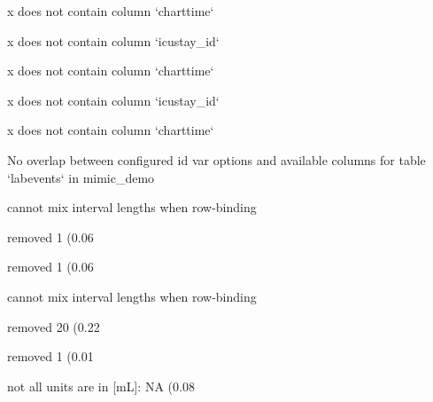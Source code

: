 \documentclass[
]{jss}
\begin{document}
\begin{CodeChunk}
\begin{CodeOutput}
x does not contain column `charttime`
\end{CodeOutput}

\begin{CodeOutput}
x does not contain column `icustay_id`
\end{CodeOutput}

\begin{CodeOutput}
x does not contain column `charttime`
\end{CodeOutput}

\begin{CodeOutput}
x does not contain column `icustay_id`
\end{CodeOutput}

\begin{CodeOutput}
x does not contain column `charttime`
\end{CodeOutput}

\begin{CodeOutput}
No overlap between configured id var options and available columns for table
`labevents` in mimic_demo
\end{CodeOutput}

\begin{CodeOutput}
cannot mix interval lengths when row-binding
\end{CodeOutput}

\begin{CodeOutput}
removed 1 (0.06%
\end{CodeOutput}

\begin{CodeOutput}
removed 1 (0.06%
\end{CodeOutput}

\begin{CodeOutput}
cannot mix interval lengths when row-binding
\end{CodeOutput}

\begin{CodeOutput}
removed 20 (0.22%
\end{CodeOutput}

\begin{CodeOutput}
removed 1 (0.01%
\end{CodeOutput}

\begin{CodeOutput}
not all units are in [mL]: NA (0.08%
\end{CodeOutput}


\end{CodeChunk}
\end{document}
